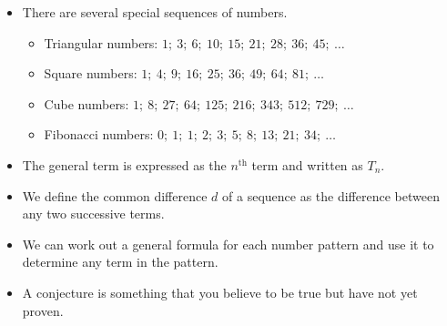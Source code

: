 \begin{itemize}[noitemsep]
\item There are several special sequences of numbers.
    \begin{itemize}[noitemsep]
    \item Triangular numbers: $1;~3;~6;~10;~15;~21;~28;~36;~45;~\ldots$
    \item Square numbers: $1;~4;~9;~16;~25;~36;~49;~64;~81;~\ldots$
    \item Cube numbers: $1;~8;~27;~64;~125;~216;~343;~512;~729;~\ldots$
    \item Fibonacci numbers: $0;~1;~1;~2;~3;~5;~8;~13;~21;~34;~\ldots$
    \end{itemize}
\item The general term is expressed as the ${n}^{\mbox{th}}$ term and written as ${T}_{n}$.
\item We define the common difference $d$ of a sequence as the difference between any two successive terms.
\item We can work out a general formula for each number pattern and use it to determine any term in the pattern.
\item A conjecture is something that you believe to be true but have not yet proven.
\end{itemize}
            

